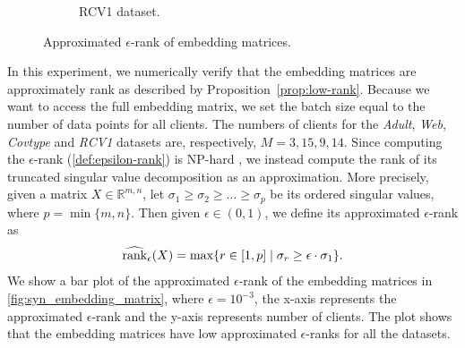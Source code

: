 \begin{figure}[t]
\begin{subfigure}{.24\textwidth}
      \caption{RCV1 dataset.}
      \label{fig:syn_embedding_matrix_rcv1}
    \end{subfigure}
    \caption{Approximated $\epsilon$-rank of embedding matrices.}
    \label{fig:syn_embedding_matrix}
\end{figure}

In this experiment, we numerically verify that the embedding matrices are approximately rank as described by Proposition~\ref{prop:low-rank}. Because we want to access the full embedding matrix, we set the batch size equal to the number of data points for all clients. The numbers of clients for the \emph{Adult}, \emph{Web}, \emph{Covtype} and \emph{RCV1} datasets are, respectively, $M = 3, 15, 9, 14$. Since computing the $\epsilon$-rank (\autoref{def:epsilon-rank}) is NP-hard \cite{udell2019big}, we instead compute the rank of its truncated singular value decomposition as an approximation. More precisely, given a matrix $X \in \mathbb{R}^{m, n}$, let 
$\sigma_1 \geq \sigma_2 \geq \dots \geq \sigma_p$
be its ordered singular values, where $p = \min\{m,n\}$. Then given $\epsilon \in (0, 1)$, we define its approximated $\epsilon$-rank as 
\[\widehat {\operatorname{rank}}_\epsilon(X) = \max\{r \in [1, p] \mid \sigma_r \geq \epsilon \cdot \sigma_1\}.\]
We show a bar plot of the approximated $\epsilon$-rank of the embedding matrices in \autoref{fig:syn_embedding_matrix}, where $\epsilon=10^{-3}$, the x-axis represents the approximated $\epsilon$-rank and the y-axis represents number of clients. The plot shows that the embedding matrices have low approximated $\epsilon$-ranks for all the datasets.

